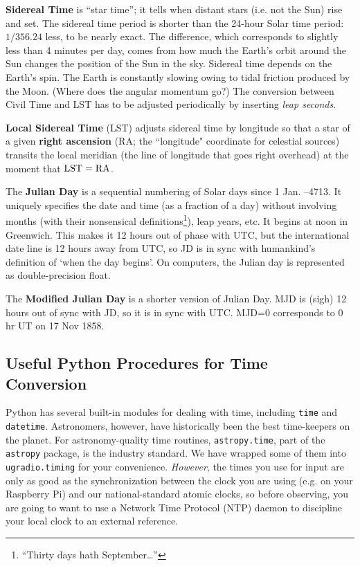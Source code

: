 \documentclass[11pt,preprint]{aastex}
\begin{document}
{\bf Sidereal Time} is ``star time''; it tells when
distant stars (i.e. not the Sun) rise and set. The sidereal time period is
shorter than the 24-hour Solar time period: $1/356.24$ less, to
be nearly exact. The difference, which corresponds to slightly 
less than 4 minutes per day, comes from how much the Earth's orbit around the
Sun changes the position of the Sun in the sky.
Sidereal time depends on the Earth's spin. The
Earth is constantly slowing owing to tidal friction produced by the
Moon. (Where does the angular momentum go?) The conversion between Civil Time and LST has to be adjusted
periodically by inserting {\it leap seconds}.

{\bf Local Sidereal Time} (LST)
adjusts sidereal time by longitude so that a star of a given {\bf right ascension} 
(RA; the ``longitude" coordinate for celestial sources) transits the local meridian
(the line of longitude that goes right overhead) at the moment
that ${\rm LST}={\rm RA}$. 

The {\bf Julian Day} is a sequential numbering of Solar days since 1 Jan. --4713. 
It
uniquely specifies the date and time (as a fraction of a day) without 
involving 
months (with their nonsensical definitions\footnote{``Thirty days
  hath September\dots''}), leap years, etc. It begins at noon 
in Greenwich. This makes it 12 hours out of phase with UTC, but the
international date line is 12 hours away from UTC, so JD is in sync
with humankind's definition of `when the day begins'. 
On computers, the Julian day is represented as double-precision
float.

The {\bf Modified Julian Day} is a shorter version of Julian Day. MJD is (sigh) 12
hours out of sync with JD, so it is in sync with UTC.
MJD=0 corresponds to 0 hr UT on 17 Nov 1858.

\subsection{ Useful Python Procedures for Time Conversion}

\noindent
Python has several built-in modules for dealing with time, including {\tt time} 
and {\tt datetime}.
Astronomers, however, have historically been the best time-keepers on the planet.  For
astronomy-quality time routines, {\tt astropy.time}, part of the {\tt astropy} package, is
the industry standard.  We have wrapped some of them into {\tt ugradio.timing} for
your convenience. {\it However}, the times you use for input are only as good
as the synchronization between the clock you are using (e.g. on your Raspberry
Pi) and our national-standard atomic clocks, so before observing,
you are going to want to use a Network Time Protocol
(NTP) daemon to discipline your local clock to an external reference.
\end{document}
